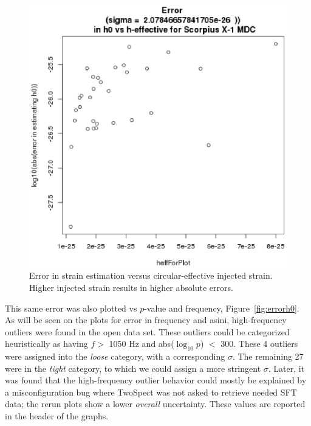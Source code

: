 \begin{figure}
\begin{center}
\includegraphics[width=0.3\paperwidth,height=0.2\paperheight]{detectedHerrVsHeffective.eps}
\caption{ Error in strain estimation versus circular-effective injected strain. Higher injected strain results in higher absolute errors.
\label{fig:detectedherrvsheffective}} 
\end{center}
\end{figure}


This same error was also plotted vs $p$-value and frequency, Figure~\ref{fig:errorh0}. As will be seen on the plots for error in frequency and asini, high-frequency outliers were found in the open data set. These outliers could be categorized heuristically as having $f >$ 1050 Hz and abs($\log_{10}p$) $<$ 300. These 4 outliers were assigned into the \textit{loose} category, with a corresponding $\sigma$. The remaining 27 were in the \textit{tight} category, to which we could assign a more stringent $\sigma$. Later, it was found that the high-frequency outlier behavior could mostly be explained by a misconfiguration bug where TwoSpect was not asked to retrieve needed SFT data; the rerun plots show a lower \textit{overall} uncertainty. These values are reported in the header of the graphs.


